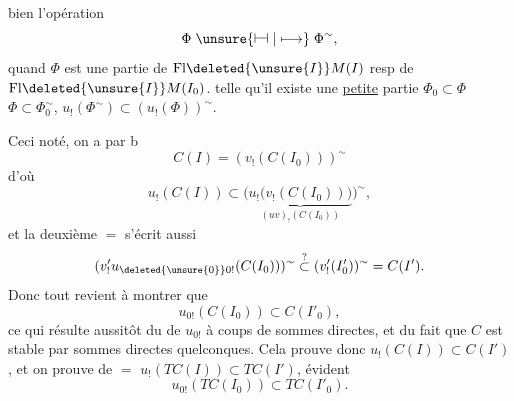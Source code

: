 
 bien   l'opération
\[
\Phi\mathrel{\unsure{\vdash\joinrel\dashv|\longmapsto}}\Phi^{\sim},
\]
quand $\Phi$ est une partie de $\mathrm{Fl}\deleted{\unsure{I}}M(I)$
resp de $\mathrm{Fl}\deleted{\unsure{I}}M(I_{0})$. 
telle qu'il existe une \uline{petite} partie
$\Phi_{0}\subset\Phi$  $\Phi\subset\Phi_{0}^{\sim}$,
$u_{!}(\Phi^{\sim})\subset(u_{!}(\Phi))^{\sim}$.

Ceci noté, on a par b
\[
 C(I)=(v_{!}(C(I_{0})))^{\sim}
\]
d'où
\[
 u_{!}(C(I))\subset
 \bigl(\underbrace{u_{!}\bigl(v_{!}(C(I_{0}))\bigr)}_{(uv)_{!}(C(I_{0}))}\bigr)^{\sim},
\]
et la deuxième $=$ s'écrit aussi
\[
 (v'_{!}u_{\deleted{\unsure{0}}0!}(C(I_{0})))^{\sim}
 \overset{?}{\subset}(v'_{!}(I'_{0}))^{\sim}=C(I').
\]
Donc tout revient à montrer que
\[
 u_{0!}(C(I_{0}))\subset C(I'_{0}),\tag*{(6.1.16)}
\]
ce qui résulte aussitôt du 
de $u_{0!}$ à coups de sommes directes,
et du fait que $C$ est stable par
sommes directes quelconques. Cela
prouve donc $u_{!}(C(I))\subset C(I')$, et on
prouve de $=$ $u_{!}(TC(I))\subset TC(I')$,
  évident
\[
 u_{0!}(TC(I_{0}))\subset TC(I'_{0}).\tag*{(6.1.17)}
\]

